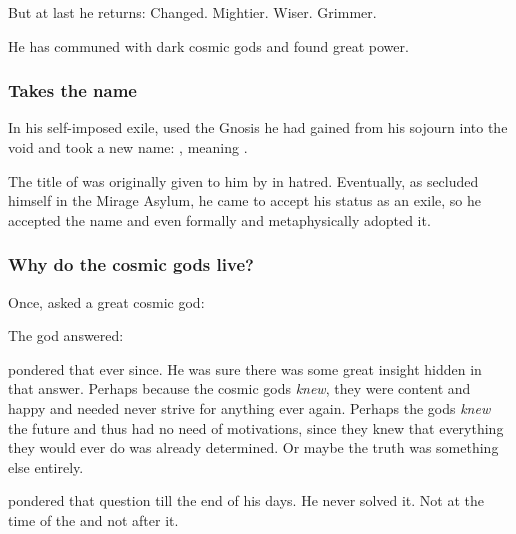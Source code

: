 But at last he returns: 
Changed. 
Mightier. 
Wiser. 
Grimmer. 

He has communed with dark cosmic gods and found great power. 






\subsubsection{Takes the name \Tzeorossh}
In his self-imposed exile, \Ishnaruchaefir used the Gnosis he had gained from his sojourn into the void and took a new name:
\quo{\Tzeorossh}, meaning .

The title of  was originally given to him by \Secherdamon in hatred.
Eventually, as \Ishnaruchaefir secluded himself in the Mirage Asylum, he came to accept his status as an exile, so he accepted the name and even formally and metaphysically adopted it.





\subsubsection{Why do the cosmic gods live?}
Once, \Ishnaruchaefir asked a great cosmic god:

The god answered: 

\Ishnaruchaefir pondered that ever since. 
He was sure there was some great insight hidden in that answer. 
Perhaps because the cosmic gods \emph{knew}, they were content and happy and needed never strive for anything ever again. 
Perhaps the gods \emph{knew} the future and thus had no need of motivations, since they knew that everything they would ever do was already determined. 
Or maybe the truth was something else entirely.

\Ishnaruchaefir pondered that question till the end of his days. 
He never solved it.
Not at the time of the \thirdbanewar and not after it. 





